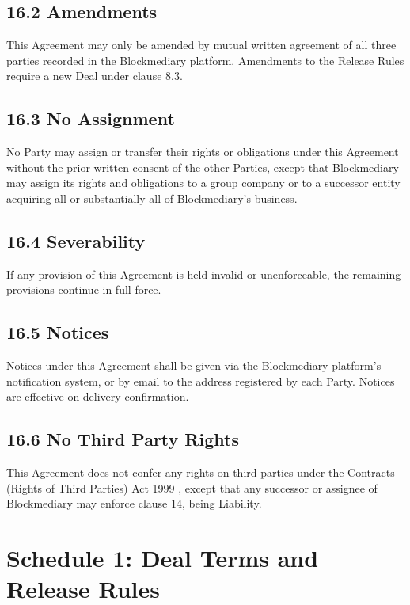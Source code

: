 \documentclass[12pt, a4paper]{article}
\begin{document}
\subsection*{16.2 Amendments}

This Agreement may only be amended by mutual written agreement of all three parties
recorded in the Blockmediary platform. Amendments to the Release Rules require a new Deal
under clause 8.3.

\subsection*{16.3 No Assignment}

No Party may assign or transfer their rights or obligations under this Agreement without
the prior written consent of the other Parties, except that Blockmediary may assign its
rights and obligations to a group company or to a successor entity acquiring all or
substantially all of Blockmediary's business.

\subsection*{16.4 Severability}

If any provision of this Agreement is held invalid or unenforceable, the remaining
provisions continue in full force.

\subsection*{16.5 Notices}

Notices under this Agreement shall be given via the Blockmediary platform's notification
system, or by email to the address registered by each Party. Notices are effective on
delivery confirmation.

\subsection*{16.6 No Third Party Rights}

This Agreement does not confer any rights on third parties under the Contracts (Rights of
Third Parties) Act 1999 \citep{crtpa1999}, except that any successor or assignee of
Blockmediary may enforce clause 14, being Liability.

\section*{Schedule 1: Deal Terms and Release Rules}
\end{document}

